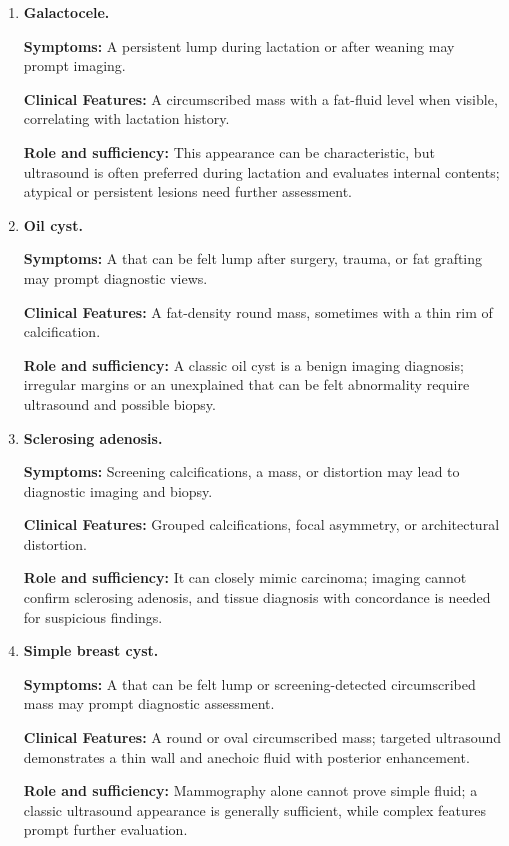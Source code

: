 \begin{enumerate}[leftmargin=*,itemsep=0.45em,topsep=0.4em]
\item \textbf{Galactocele.}\par\noindent\textbf{Symptoms:} A persistent lump during lactation or after weaning may prompt imaging.\par\noindent\textbf{Clinical Features:} A circumscribed mass with a fat-fluid level when visible, correlating with lactation history.\par\noindent\textbf{Role and sufficiency:} This appearance can be characteristic, but ultrasound is often preferred during lactation and evaluates internal contents; atypical or persistent lesions need further assessment.
\item \textbf{Oil cyst.}\par\noindent\textbf{Symptoms:} A that can be felt lump after surgery, trauma, or fat grafting may prompt diagnostic views.\par\noindent\textbf{Clinical Features:} A fat-density round mass, sometimes with a thin rim of calcification.\par\noindent\textbf{Role and sufficiency:} A classic oil cyst is a benign imaging diagnosis; irregular margins or an unexplained that can be felt abnormality require ultrasound and possible biopsy.
\item \textbf{Sclerosing adenosis.}\par\noindent\textbf{Symptoms:} Screening calcifications, a mass, or distortion may lead to diagnostic imaging and biopsy.\par\noindent\textbf{Clinical Features:} Grouped calcifications, focal asymmetry, or architectural distortion.\par\noindent\textbf{Role and sufficiency:} It can closely mimic carcinoma; imaging cannot confirm sclerosing adenosis, and tissue diagnosis with concordance is needed for suspicious findings.
\item \textbf{Simple breast cyst.}\par\noindent\textbf{Symptoms:} A that can be felt lump or screening-detected circumscribed mass may prompt diagnostic assessment.\par\noindent\textbf{Clinical Features:} A round or oval circumscribed mass; targeted ultrasound demonstrates a thin wall and anechoic fluid with posterior enhancement.\par\noindent\textbf{Role and sufficiency:} Mammography alone cannot prove simple fluid; a classic ultrasound appearance is generally sufficient, while complex features prompt further evaluation.
\end{enumerate}

